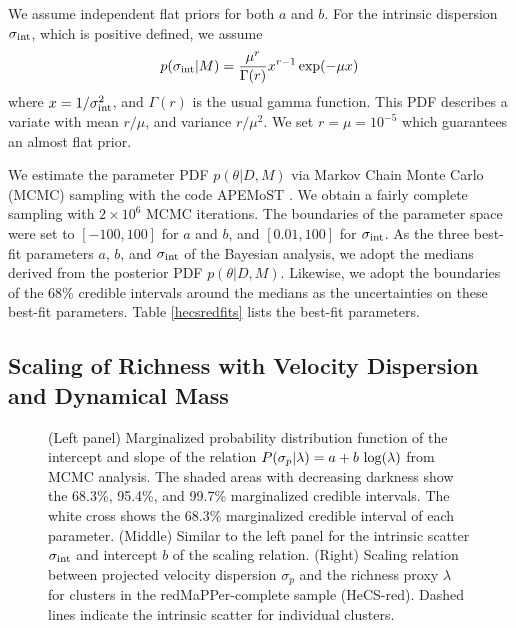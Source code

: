 We assume independent flat priors for both $a$ and $b$.
For the intrinsic dispersion $\sigma_{\rm int}$, which is
positive defined, we assume
\begin{equation}
p(\sigma_{\rm int}\vert M) = {\mu^r\over \Gamma(r)}  x^{r-1} \exp(-\mu x) 
\end{equation}
where $x=1/\sigma_{\rm int}^2$, and $\Gamma(r)$ is the usual gamma function.
This PDF describes a variate with mean $ r/\mu$, and variance $ r/\mu^2$.
We set $r=\mu=10^{-5}$ which guarantees an almost flat prior.


We estimate the parameter PDF $p(\theta\vert D, M)$ via Markov Chain Monte Carlo (MCMC)
sampling with the code APEMoST  \citep{buchner11, gruberbauer09}.
We obtain a fairly complete sampling with $2\times 10^6$ MCMC iterations.
The boundaries of the parameter space were set to
$[-100,100]$ for $a$ and $b$, and $[0.01,100]$ for $\sigma_{\rm int}$.
As the three best-fit parameters $a$, $b$, and $\sigma_{\rm int}$ of the Bayesian 
analysis, we adopt the medians derived from the posterior PDF $p(\theta\vert D,M)$. 
Likewise, we adopt the boundaries of the 68\% credible intervals around the 
medians as the uncertainties on these best-fit parameters.
Table \ref{hecsredfits} lists the best-fit parameters.


\subsection{Scaling of Richness with Velocity Dispersion and Dynamical Mass}


\begin{figure*} 
\caption{\label{sigmapvsrichred} (Left panel) Marginalized probability distribution function of the intercept and slope 
of the relation $P(\sigma_p|\lambda) = a + b~ {\rm log}(\lambda)$ from MCMC analysis.  The shaded areas with decreasing darkness show the 68.3\%, 95.4\%, and 99.7\% marginalized credible intervals.  The white cross shows the 68.3\% marginalized credible interval of each parameter.
(Middle) Similar to the left panel for the intrinsic scatter $\sigma_{\rm int}$ and intercept $b$ of the scaling relation.
(Right) Scaling relation between projected velocity dispersion $\sigma_p$ and 
the richness proxy $\lambda$ for clusters in the redMaPPer-complete sample (HeCS-red). 
Dashed lines indicate the intrinsic scatter for individual clusters. 
}
\end{figure*}

